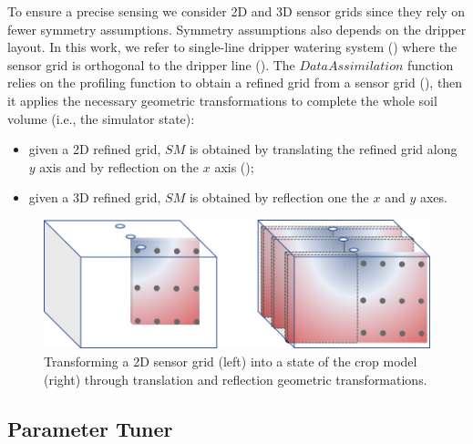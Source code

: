To ensure a precise sensing we consider 2D and 3D sensor grids since they rely on fewer symmetry assumptions.
Symmetry assumptions also depends on the dripper layout.
In this work, we refer to single-line dripper watering system ()
where the sensor grid is orthogonal to the dripper line (). 
The $DataAssimilation$ function relies on the profiling function to obtain a refined grid from a sensor grid (), then it applies the necessary geometric transformations to complete the whole soil volume (i.e., the simulator state):
\begin{itemize}
    \item given a 2D refined grid, $SM$ is obtained by translating the refined grid along $y$ axis and by reflection on the $x$ axis ();
    \item given a 3D refined grid, $SM$ is obtained by reflection one the $x$ and $y$ axes.
\end{itemize}

 \begin{figure}[t]
	\centering
	\includegraphics[scale=0.7]{chapters/physics-aware/orchard/img/Simmetries.png}
	\caption{Transforming a 2D sensor grid (left) into a state of the crop model (right) through translation and reflection geometric transformations.}
	\label{orchard-fig:simmetries}
\end{figure}


\subsection{Parameter Tuner}

